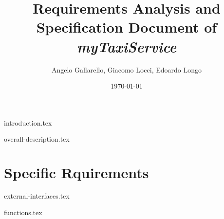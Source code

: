 \documentclass[12pt, a4paper]{article}
\begin{document}
\title{Requirements Analysis and Specification Document of \emph{myTaxiService}}

\author{Angelo Gallarello, Giacomo Locci, Edoardo Longo}
\date{\today}
\maketitle

\newpage

\tableofcontents

\newpage


{introduction.tex}

{overall-description.tex}

\section{Specific Rquirements} %
\label{sec:specific_rquirements}

{external-interfaces.tex}

{functions.tex}

\end{document}
